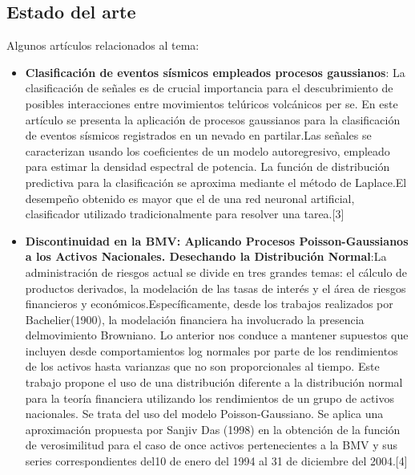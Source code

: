 \documentclass[12pt,a4paper]{article}
\begin{document}
\begin{multicols}{2}
\section{Estado del arte}
    Algunos artículos relacionados al tema:
    \begin{itemize}
        \item \textbf{Clasificación de eventos sísmicos empleados  procesos gaussianos}: La clasificación de señales es de crucial  importancia para el descubrimiento de posibles interacciones entre movimientos telúricos volcánicos per se. En este artículo  se presenta la aplicación de procesos gaussianos para la clasificación de eventos sísmicos registrados en un nevado en partilar.Las señales se caracterizan usando los coeficientes  de un modelo autoregresivo, empleado para estimar la densidad espectral de potencia. La función de distribución predictiva para la clasificación se aproxima mediante el método de Laplace.El desempeño obtenido es mayor que el de una red neuronal artificial, clasificador  utilizado tradicionalmente para resolver una tarea.[3]\\
        \item \textbf{Discontinuidad en la BMV: Aplicando Procesos Poisson-Gaussianos a los Activos Nacionales. Desechando la Distribución Normal}:La administración de riesgos actual se divide en tres grandes temas: el cálculo de productos derivados, la modelación de las tasas de interés y el área de riesgos financieros y económicos.Específicamente, desde los trabajos realizados por Bachelier(1900), la modelación financiera ha involucrado la presencia delmovimiento Browniano. Lo anterior nos conduce a mantener supuestos que incluyen desde comportamientos log normales por parte de los rendimientos de los activos hasta varianzas que no son proporcionales al tiempo. Este trabajo propone el uso de una distribución diferente a la distribución normal para la teoría financiera utilizando los rendimientos de un grupo de activos nacionales. Se trata del uso del modelo Poisson-Gaussiano. Se aplica una aproximación propuesta por Sanjiv Das (1998) en la obtención de la función de verosimilitud para el caso de once activos pertenecientes a la BMV y sus series correspondientes del10 de enero del 1994 al 31 de diciembre del 2004.[4]\\

\end{itemize}
\end{multicols}
\end{document}
